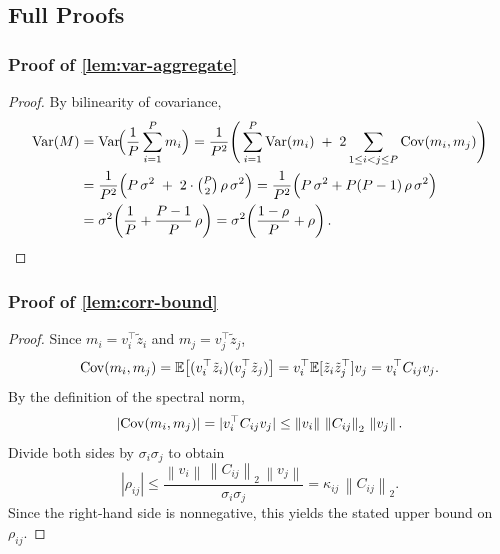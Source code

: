 \documentclass{article} %
\newcommand{\norm}[1]{\left\lVert #1 \right\rVert}
\begin{document}
\subsection{Full Proofs}

\subsubsection{Proof of \autoref{lem:var-aggregate}}
\begin{proof}
  By bilinearity of covariance,
  \begin{align*}
    \mathrm{Var}(M)
    &= \mathrm{Var}\!\Big(\frac{1}{P}\sum_{i=1}^P m_i\Big)
    = \frac{1}{P^2}\Bigg(\sum_{i=1}^P \mathrm{Var}(m_i) \;+\; 2\sum_{1\le i<j\le P}\mathrm{Cov}(m_i,m_j)\Bigg)\\
    &= \frac{1}{P^2}\Big(P\,\sigma^2 \;+\; 2\cdot \tbinom{P}{2}\,\rho\,\sigma^2\Big)
    = \frac{1}{P^2}\Big(P\,\sigma^2 + P(P-1)\,\rho\,\sigma^2\Big)\\
    &= \sigma^2\!\left(\frac{1}{P} + \frac{P-1}{P}\,\rho\right)
    = \sigma^2\!\left(\frac{1-\rho}{P}+\rho\right).
  \end{align*}
\end{proof}

\subsubsection{Proof of \autoref{lem:corr-bound}}
\begin{proof}
  Since $m_i=v_i^\top \tilde z_i$ and $m_j=v_j^\top \tilde z_j$,
  \begin{equation}
    \mathrm{Cov}(m_i,m_j)
    = \mathbb{E}\big[ (v_i^\top \tilde z_i)(v_j^\top \tilde z_j) \big]
    = v_i^\top \mathbb{E}[\tilde z_i \tilde z_j^\top] v_j
    = v_i^\top C_{ij} v_j.
  \end{equation}
  By the definition of the spectral norm,
  \begin{equation}
    |\Cov(m_i,m_j)|
    = |v_i^\top C_{ij} v_j|
    \le \norm{v_i}\,\norm{C_{ij}}_2\,\norm{v_j}.
  \end{equation}
  Divide both sides by $\sigma_i\sigma_j$ to obtain
  \begin{equation}
    |\rho_{ij}| \le \frac{\norm{v_i}\,\norm{C_{ij}}_2\,\norm{v_j}}{\sigma_i\sigma_j}
    = \kappa_{ij}\,\norm{C_{ij}}_2.
  \end{equation}
  Since the right-hand side is nonnegative, this yields the stated upper bound on $\rho_{ij}$.
\end{proof}
\end{document}
